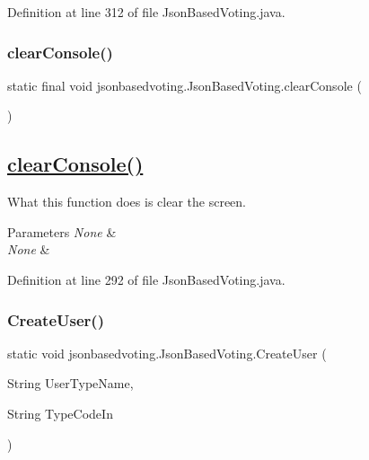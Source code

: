Definition at line 312 of file Json\+Based\+Voting.\+java.

\mbox{\label{classjsonbasedvoting_1_1_json_based_voting_a1d797d0d870297df5f50f56ab63fb7d8}} 
\subsubsection{\texorpdfstring{clearConsole()}{clearConsole()}}
{\footnotesize\ttfamily static final void jsonbasedvoting.\+Json\+Based\+Voting.\+clear\+Console (\begin{DoxyParamCaption}{ }\end{DoxyParamCaption})\hspace{0.3cm}{\ttfamily [static]}}

\subsection*{\mbox{\hyperlink{classjsonbasedvoting_1_1_json_based_voting_a1d797d0d870297df5f50f56ab63fb7d8}{clear\+Console()}} }

What this function does is clear the screen. 
\begin{DoxyParams}{Parameters}
{\em None} & \\
\hline
{\em None} & \\
\hline
\end{DoxyParams}


Definition at line 292 of file Json\+Based\+Voting.\+java.

\mbox{\label{classjsonbasedvoting_1_1_json_based_voting_ad2f672b45638c0a0767c01bf51c8098a}} 
\subsubsection{\texorpdfstring{CreateUser()}{CreateUser()}}
{\footnotesize\ttfamily static void jsonbasedvoting.\+Json\+Based\+Voting.\+Create\+User (\begin{DoxyParamCaption}\item[{String}]{User\+Type\+Name,  }\item[{String}]{Type\+Code\+In }\end{DoxyParamCaption})\hspace{0.3cm}{\ttfamily [static]}}

